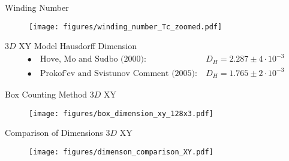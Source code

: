 \documentclass[10pt]{beamer}
\begin{document}
\begin{frame}{Winding Number}
    \begin{figure}[h!]
        \centering
            \texttt{[image: figures/winding\_number\_Tc\_zoomed.pdf]}
    \end{figure}
\end{frame}

\begin{frame}{$3D$ XY Model Hausdorff Dimension}
    \begin{align*}
        \bullet \ &\text{Hove, Mo and Sudbo (2000):}\ &D_H = 2.287 \pm 4 \cdot 10^{-3} \\
        \bullet \ &\text{Prokof'ev and Svistunov Comment (2005):} \ &D_H = 1.765 \pm 2 \cdot 10^{-3}
    \end{align*}
\end{frame}

\begin{frame}{Box Counting Method $3D$ XY}
    \begin{figure}[h!]
        \centering
            \texttt{[image: figures/box\_dimension\_xy\_128x3.pdf]}
    \end{figure}
\end{frame}

\begin{frame}{Comparison of Dimensions $3D$ XY}
    \begin{figure}[h!]
        \centering
            \texttt{[image: figures/dimenson\_comparison\_XY.pdf]}
    \end{figure}
\end{frame}
\end{document}
